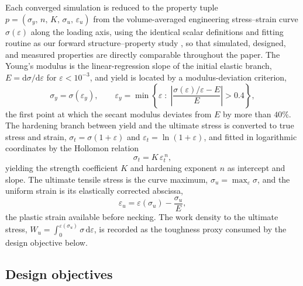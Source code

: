 \documentclass[preprint,12pt]{elsarticle}
\begin{document}
Each converged simulation is reduced to the property tuple $p=(\sigma_y,\, n,\, K,\, \sigma_u,\, \varepsilon_u)$ from the volume-averaged engineering stress--strain curve $\sigma(\varepsilon)$ along the loading axis, using the identical scalar definitions and fitting routine as our forward structure--property study \cite{Guru2025}, so that simulated, designed, and measured properties are directly comparable throughout the paper. The Young's modulus is the linear-regression slope of the initial elastic branch, $E = \mathrm{d}\sigma/\mathrm{d}\varepsilon$ for $\varepsilon < 10^{-3}$, and yield is located by a modulus-deviation criterion,
\begin{equation}
  \sigma_y = \sigma(\varepsilon_y), \qquad
  \varepsilon_y = \min\left\{ \varepsilon \;:\; \left| \frac{\sigma(\varepsilon)/\varepsilon - E}{E} \right| > 0.4 \right\},
  \label{eq:yield}
\end{equation}
the first point at which the secant modulus deviates from $E$ by more than $40\%$. The hardening branch between yield and the ultimate stress is converted to true stress and strain, $\sigma_t = \sigma(1+\varepsilon)$ and $\varepsilon_t = \ln(1+\varepsilon)$, and fitted in logarithmic coordinates by the Hollomon relation \cite{Hollomon1945}
\begin{equation}
  \sigma_t = K\,\varepsilon_t^{\,n},
  \label{eq:hollomon}
\end{equation}
yielding the strength coefficient $K$ and hardening exponent $n$ as intercept and slope. The ultimate tensile stress is the curve maximum, $\sigma_u = \max_\varepsilon \sigma$, and the uniform strain is its elastically corrected abscissa,
\begin{equation}
  \varepsilon_u = \varepsilon(\sigma_u) - \frac{\sigma_u}{E},
  \label{eq:uniform}
\end{equation}
the plastic strain available before necking. The work density to the ultimate stress, $W_u = \int_0^{\varepsilon(\sigma_u)} \sigma\, \mathrm{d}\varepsilon$, is recorded as the toughness proxy consumed by the design objective below.

\subsection{Design objectives}
\label{sec:objectives}
\end{document}
